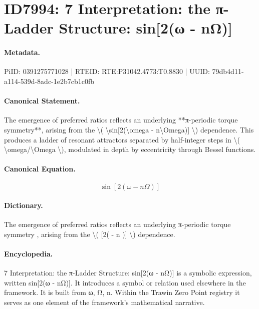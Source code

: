 \section*{ID7994: 7 Interpretation: the π-Ladder Structure: sin[2(ω - nΩ)]}
\paragraph{Metadata.}
PiID: 0391275771028 | RTEID: RTE:P31042.4773:T0.8830 | UUID: 79db4d11-a114-539d-8adc-1e2b7cb1c0fb

\paragraph{Canonical Statement.}
The emergence of preferred ratios reflects an underlying **π-periodic torque symmetry**, arising from the \textbackslash{}( \textbackslash{}sin[2(\textbackslash{}omega - n\textbackslash{}Omega)] \textbackslash{}) dependence. This produces a ladder of resonant attractors separated by half-integer steps in \textbackslash{}( \textbackslash{}omega/\textbackslash{}Omega \textbackslash{}), modulated in depth by eccentricity through Bessel functions.

\paragraph{Canonical Equation.}
\[
\sin[2(\omega - n\Omega)]
\]

\paragraph{Dictionary.}
The emergence of preferred ratios reflects an underlying π-periodic torque symmetry , arising from the \textbackslash{}( [2( - n )] \textbackslash{}) dependence.

\paragraph{Encyclopedia.}
7 Interpretation: the π-Ladder Structure: sin[2(ω - nΩ)] is a symbolic expression, written sin[2(ω - nΩ)]. It introduces a symbol or relation used elsewhere in the framework. It is built from ω, Ω, n. Within the Trawin Zero Point registry it serves as one element of the framework's mathematical narrative.
